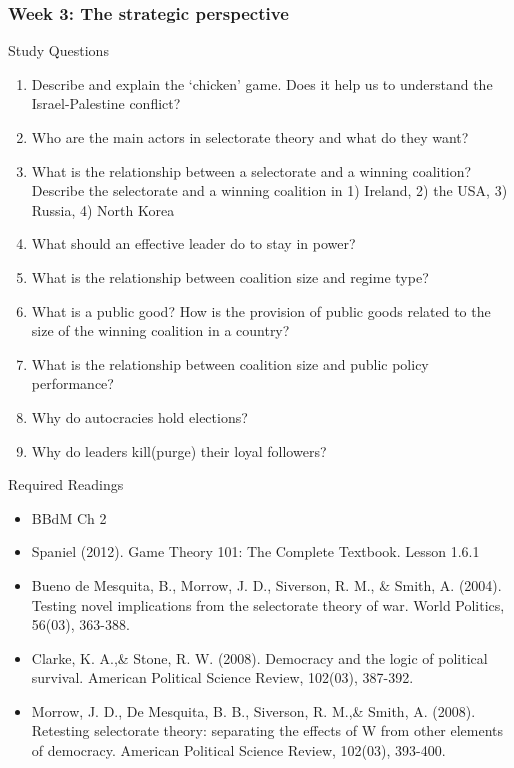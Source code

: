 \documentclass[12pt,a4paper]{article}
\begin{document}
\subsubsection*{Week 3: The strategic perspective}

Study Questions

\begin{enumerate}
	\item Describe and explain the `chicken' game. Does it help us to understand the Israel-Palestine conflict?
	\item Who are the main actors in selectorate theory and what do they want? 
	\item What is the relationship between a selectorate and a winning coalition? Describe the selectorate and a winning coalition in 1) Ireland, 2) the USA, 3) Russia, 4) North Korea
	\item What should an effective leader do to stay in power? 
	\item What is the relationship between coalition size and regime type?
	\item What is a public good? How is the provision of public goods related to the size of the winning coalition in a country?
	\item What is the relationship between coalition size and public policy performance?
	\item Why do autocracies hold elections? 
	\item Why do leaders kill(purge) their loyal followers? 
\end{enumerate}
	
\noindent Required Readings

\begin{itemize}
	\item BBdM Ch 2
	\item Spaniel (2012). Game Theory 101: The Complete Textbook. Lesson 1.6.1
	\item Bueno de Mesquita, B., Morrow, J. D., Siverson, R. M., \& Smith, A. (2004). Testing novel implications from the selectorate theory of war. World Politics, 56(03), 363-388.
	\item Clarke, K. A.,\& Stone, R. W. (2008). Democracy and the logic of political survival. American Political Science Review, 102(03), 387-392.
	\item Morrow, J. D., De Mesquita, B. B., Siverson, R. M.,\& Smith, A. (2008). Retesting selectorate theory: separating the effects of W from other elements of democracy. American Political Science Review, 102(03), 393-400.
\end{itemize}
\end{document}
